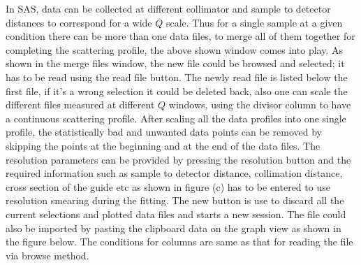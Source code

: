 In SAS, data can be collected at different collimator and sample to
detector distances to correspond for a wide $Q$ scale. Thus for a
single sample at a given condition there can be more than one data
files, to merge all of them together for completing the scattering
profile, the above shown window comes into play. As shown in the
merge files window, the new file could be browsed and selected; it
has to be read using the read file button. The newly read file
is listed below the first file, if it's a wrong selection it could
be deleted back, also one can scale the different files measured at
different $Q$ windows, using the divisor column to have a continuous
scattering profile. After scaling all the data profiles into one
single profile, the statistically bad and unwanted data points can
be removed by skipping the points at the beginning and at the end of
the data files. The resolution parameters can be provided by
pressing the resolution button and the required information such as
sample to detector distance, collimation distance, cross section of
the guide etc as shown in figure  \label{fig:QTmergeSDScapt}(c) has to be entered to use
resolution smearing during the fitting. The new button is use to
discard all the current selections and plotted data files and starts
a new session. The file could also be imported by pasting the
clipboard data on the graph view as shown in the figure below. The
conditions for columns are same as that for reading the file via
browse method.



